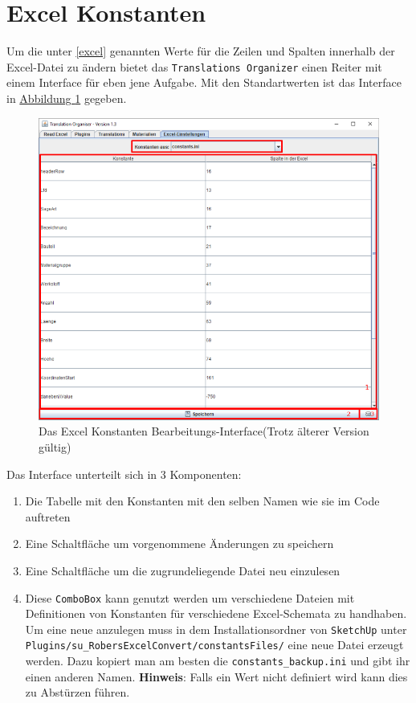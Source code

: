 \documentclass{book}
\newcommand{\sketchup}{\texttt{SketchUp}\xspace}
\newcommand{\assisttool}{\texttt{Translations Organizer}\xspace}
\newcommand{\hinweis}[1]{\newline \textbf{Hinweis}: #1 \newline}
\begin{document}
	 	\section{Excel Konstanten}\label{excel konstanten}
			 Um die unter \ref{excel} genannten Werte für die Zeilen und Spalten innerhalb der Excel-Datei zu ändern bietet das \assisttool einen Reiter mit einem Interface für eben jene Aufgabe. Mit den Standartwerten ist das Interface in \hyperref[fig:excel constants]{Abbildung \ref{fig:excel constants}} gegeben.
		 	\begin{figure}[H]
		 		\centering
		 		\includegraphics[scale=0.48]{pics/assisttool/excel-konstanten.PNG}
		 		\caption{Das Excel Konstanten Bearbeitungs-Interface\newline (Trotz älterer Version gültig)}
		 		\label{fig:excel constants}
		 	\end{figure}
		 	Das Interface unterteilt sich in 3 Komponenten:
			 	\begin{enumerate}
			 		\item Die Tabelle mit den Konstanten mit den selben Namen wie sie im Code auftreten
			 		\item Eine Schaltfläche um vorgenommene Änderungen zu speichern
			 		\item Eine Schaltfläche um die zugrundeliegende Datei neu einzulesen
			 		\item Diese \texttt{ComboBox} kann genutzt werden um verschiedene Dateien mit Definitionen von Konstanten für verschiedene Excel-Schemata zu handhaben. Um eine neue anzulegen muss in dem Installationsordner von \sketchup unter \texttt{Plugins/su\_RobersExcelConvert/constantsFiles/} eine neue Datei erzeugt werden. Dazu kopiert man am besten die \texttt{constants\_backup.ini} und gibt ihr einen anderen Namen. 
			 		\hinweis{Falls ein Wert nicht definiert wird kann dies zu Abstürzen führen.}
			 	\end{enumerate}
		 	
\end{document}
